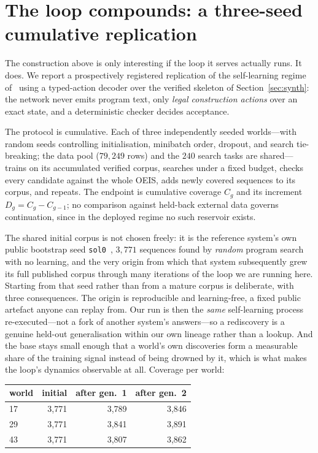 \documentclass[11pt]{article}
\newcommand{\code}[1]{\texttt{#1}}
\begin{document}
\section{The loop compounds: a three-seed cumulative replication}
\label{sec:loop}

The construction above is only interesting if the loop it serves actually runs. It does. We
report a prospectively registered replication of the self-learning regime
of~\cite{gauthier2023} using a typed-action decoder over the verified skeleton of
Section~\ref{sec:synth}: the network never emits program text, only \emph{legal construction
actions} over an exact state, and a deterministic checker decides acceptance.

The protocol is cumulative. Each of three independently seeded worlds---with random seeds
controlling initialisation, minibatch order, dropout, and search
tie-breaking; the data pool ($79{,}249$ rows) and the $240$ search tasks are shared---trains
on its accumulated verified corpus, searches under a fixed budget, checks every candidate
against the whole OEIS, adds newly covered sequences to its corpus, and repeats. The
endpoint is cumulative coverage $C_g$ and its increment $D_g = C_g - C_{g-1}$; no
comparison against held-back external data governs continuation, since in the deployed
regime no such reservoir exists.

The shared initial corpus is not chosen freely: it is the reference system's own public
bootstrap seed \code{sol0}~\cite{gauthier2023}, $3{,}771$ sequences found by \emph{random}
program search with no learning, and the very origin from which that system subsequently
grew its full published corpus through many iterations of the loop we are running here.
Starting from that seed rather than from a mature corpus is deliberate, with three
consequences. The origin is reproducible and learning-free, a fixed public artefact anyone
can replay from. Our run is then the \emph{same} self-learning process re-executed---not a
fork of another system's answers---so a rediscovery is a genuine held-out generalisation
within our own lineage rather than a lookup. And the base stays small enough that a world's
own discoveries form a measurable share of the training signal instead of being drowned by
it, which is what makes the loop's dynamics observable at all. Coverage per world:

\begin{center}
\begin{tabular}{lrrr}
\toprule
world & initial & after gen.\ 1 & after gen.\ 2 \\
\midrule
17 & 3{,}771 & 3{,}789 & 3{,}846 \\
29 & 3{,}771 & 3{,}841 & 3{,}891 \\
43 & 3{,}771 & 3{,}807 & 3{,}862 \\
\bottomrule
\end{tabular}
\end{center}
\end{document}
